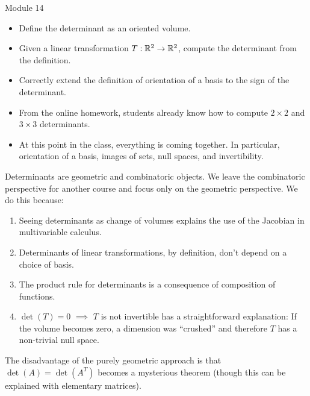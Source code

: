 \documentclass{workbook}
\begin{document}
\begin{lesson}

	Module 14

	\begin{itemize}
		\item Define the determinant as an oriented volume.
		\item Given a linear transformation $T:\mathbb{R}^2\to\mathbb{R}^2$,
			compute the determinant from the definition.
		\item Correctly extend the definition of orientation of a basis to the sign
			of the determinant.
	\end{itemize}

	\begin{annotation}
		\begin{notes}
			\begin{itemize}
				\item From the online homework, students already know how to compute $2\times 2$ and
					$3\times 3$ determinants.
				\item At this point in the class, everything is coming together. In particular, orientation
					of a basis, images of sets, null spaces, and invertibility.
			\end{itemize}
		\end{notes}
	\end{annotation}
	Determinants are geometric and combinatoric objects. We leave the combinatoric perspective for another
	course and focus only on the geometric perspective. We do this because:
	\begin{enumerate}
		\item Seeing determinants as change of volumes explains the use of the Jacobian in multivariable calculus.
		\item Determinants of linear transformations, by definition, don't depend on a choice of basis.
		\item The product rule for determinants is a consequence of composition of functions.
		\item $\det(T) = 0$ $\implies$ $T$ is not invertible has a straightforward explanation: If the volume
			becomes zero, a dimension was ``crushed'' and therefore $T$ has a non-trivial null space.
	\end{enumerate}
	The disadvantage of the purely geometric approach is that $\det(A)=\det(A^T)$ becomes a mysterious theorem
	(though this can be explained with elementary matrices).



\end{lesson}
\end{document}
